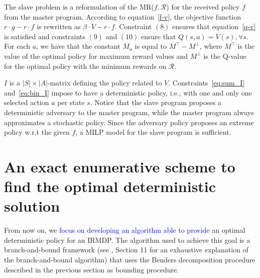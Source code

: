 \documentclass[runningheads,a4paper]{llncs}
\newcommand{\ET}[1]{{\textcolor{blue}{#1}}}
\begin{document}
The slave problem is a reformulation of the MR($f, \mathcal{R}$) for the received policy $f$ from the master program. According to equation~\eqref{f-v}, the objective function $r \cdot g - r \cdot f$ is rewritten as $\beta \cdot V - r \cdot f$. 
% 
Constraint $(8)$ ensures that equation~\eqref{q-v} is satisfied and 
%
constraints $(9)$ and $(10)$ ensure that $Q(s, a) = V(s), \forall s $.
For each $a$, we have that the constant $M_a$ is equal to  $M^{\top} - M^{\perp}$, where  $M^{\top}$ is the value of the optimal policy for maximum reward values 
and $M^{\perp}$ is the Q-value for the optimal policy with the minimum rewards on $\mathcal{R}$. 

$I$ is a $|S|\times|A|$-matrix defining the policy related to $V$. 
Constraints~\eqref{eq:sum_I} and~\eqref{eq:bin_I} impose to  have a deterministic policy, i.e., with one and only one selected action $a$ per state $s$. Notice that the slave program proposes a deterministic adversary to the master program, while the master program always approximates a stochastic policy. Since the adversary policy proposes an extreme policy w.r.t the given $f$, a MILP model for the slave program is sufficient.   


\section{An exact enumerative scheme to find the optimal deterministic solution}\label{sec:bb} 

From now on, we \ET{focus on developing an algorithm able to provide} an optimal deterministic policy for an IRMDP.
The algorithm used to achieve this goal is a branch-and-bound framework (see \cite{bertsimas2005optimization}, Section 11 for an exhaustive explanation of the branch-and-bound algorithm) that uses the Benders decomposition procedure described in the previous section as bounding procedure. 
\end{document}
